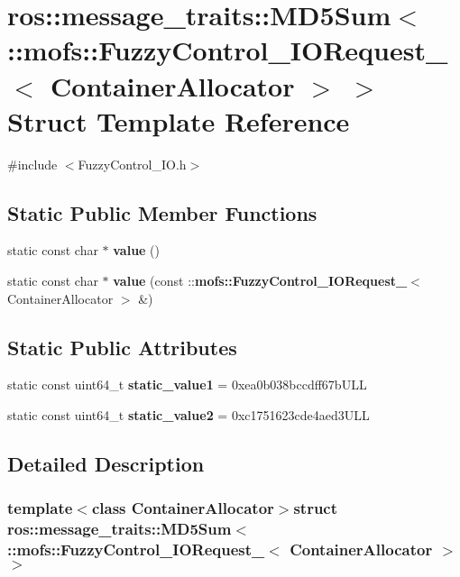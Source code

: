 \section{ros\-:\-:message\-\_\-traits\-:\-:M\-D5\-Sum$<$ \-:\-:mofs\-:\-:Fuzzy\-Control\-\_\-\-I\-O\-Request\-\_\-$<$ Container\-Allocator $>$ $>$ Struct Template Reference}
\label{structros_1_1message__traits_1_1MD5Sum_3_01_1_1mofs_1_1FuzzyControl__IORequest___3_01ContainerAllocator_01_4_01_4}


{\ttfamily \#include $<$Fuzzy\-Control\-\_\-\-I\-O.\-h$>$}

\subsection*{Static Public Member Functions}
\begin{DoxyCompactItemize}
\item 
static const char $\ast$ {\bf value} ()
\item 
static const char $\ast$ {\bf value} (const \-::{\bf mofs\-::\-Fuzzy\-Control\-\_\-\-I\-O\-Request\-\_\-}$<$ Container\-Allocator $>$ \&)
\end{DoxyCompactItemize}
\subsection*{Static Public Attributes}
\begin{DoxyCompactItemize}
\item 
static const uint64\-\_\-t {\bf static\-\_\-value1} = 0xea0b038bccdff67b\-U\-L\-L
\item 
static const uint64\-\_\-t {\bf static\-\_\-value2} = 0xc1751623cde4aed3\-U\-L\-L
\end{DoxyCompactItemize}


\subsection{Detailed Description}
\subsubsection*{template$<$class Container\-Allocator$>$struct ros\-::message\-\_\-traits\-::\-M\-D5\-Sum$<$ \-::mofs\-::\-Fuzzy\-Control\-\_\-\-I\-O\-Request\-\_\-$<$ Container\-Allocator $>$ $>$}



